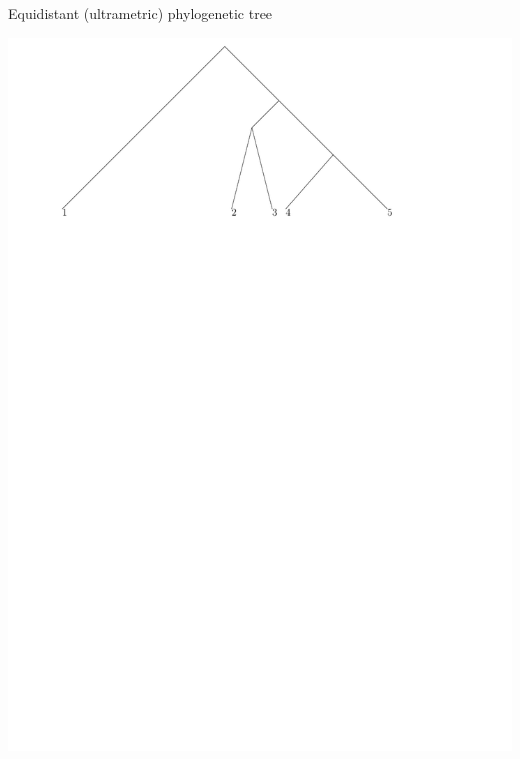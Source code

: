 \documentclass{beamer}
\theoremstyle{example}
\begin{document}
\begin{frame}{Equidistant (ultrametric) phylogenetic tree}
\begin{definition}
\includegraphics[width=\framewidth]{rooted_time}
\end{definition}
\end{frame}
\end{document}
